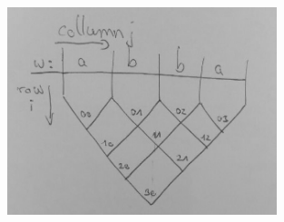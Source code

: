 \begin{figure}[h]
	\centering
	\includegraphics[width=0.7\textwidth]{abb/DataStructurePyramid}
\end{figure}
\pagebreak
